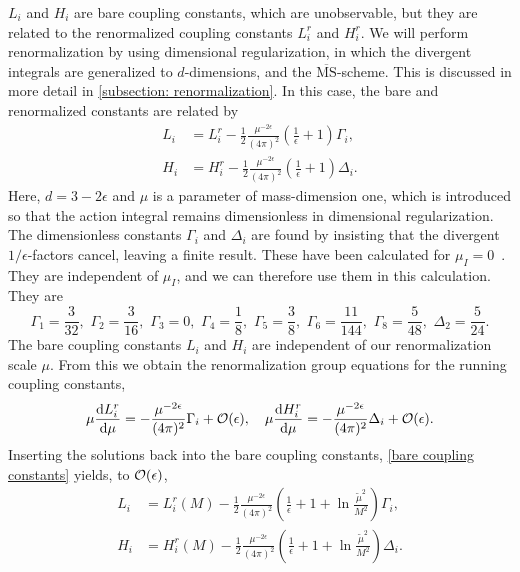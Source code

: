 $L_i$ and $H_i$  are bare coupling constants, which are unobservable, but they are related to the renormalized coupling constants $L_i^r$ and $H_i^r$.
We will perform renormalization by using dimensional regularization, in which the divergent integrals are generalized to $d$-dimensions, and the $\overline{\mathrm{MS}}$-scheme.
This is discussed in more detail in \autoref{subsection: renormalization}.
In this case, the bare and renormalized constants are related by
%
\begin{align}
    \label{bare coupling constants}
    L_i 
    & = L_i^r 
    - \frac{1}{2} \frac{\mu^{-2\epsilon}} {(4 \pi)^2}
    \left(\frac{1}{\epsilon} + 1 \right) \Gamma_i, \\
    H_i 
    & = H_i^r
    -  \frac{1}{2}  \frac{\mu^{-2\epsilon}}{(4 \pi)^2} 
    \left(\frac{1}{\epsilon} + 1 \right) \Delta_i .
\end{align}
%
Here, $d = 3 - 2\epsilon$ and $\mu$ is a parameter of mass-dimension one, which is introduced so that the action integral remains dimensionless in dimensional regularization.
The dimensionless constants $\Gamma_i$ and $\Delta_i$ are found by insisting that the divergent $1/\epsilon$-factors cancel, leaving a finite result.
These have been calculated for $\mu_I = 0$~\autocite{gasserChiralPerturbationTheory1985}.
They are independent of $\mu_I$, and we can therefore use them in this calculation.
They are
\begin{equation}
    \Gamma_1 = \frac{3}{32}, \,\,
    \Gamma_2 = \frac{3}{16}, \,\,
    \Gamma_3 = 0, \,\,
    \Gamma_4 = \frac{1}{8}, \,\,
    \Gamma_5 = \frac{3}{8}, \,\,
    \Gamma_6 = \frac{11}{144}, \,\,
    \Gamma_8 = \frac{5}{48}, \,\,
    \Delta_2 = \frac{5}{24}.
\end{equation}
%
The bare coupling constants $L_i$ and $H_i$ are independent of our renormalization scale $\mu$.
From this we obtain the renormalization group equations for the running coupling constants,
\begin{equation}
    \mu \diff{L_i^r}{\mu } 
    = - \frac{  \mu^{-2\epsilon} }{(4 \pi)^2} \Gamma_i + \mathcal{O}(\epsilon), \quad
    \mu \diff{H_i^r}{\mu } 
    = - \frac{ \mu^{-2\epsilon}}{(4 \pi)^2} \Delta_i + \mathcal{O}(\epsilon).
\end{equation}
%
Inserting the solutions back into the bare coupling constants, \autoref{bare coupling constants} yields, to $\mathcal O(\epsilon)$,
%
\begin{align}
    L_i
    &= 
    L_i^r(M)
    - \frac{1}{2} \frac{\mu^{-2\epsilon}} {(4 \pi)^2}
    \left(\frac{1}{\epsilon} + 1 + \ln{\frac{\tilde \mu^2}{M^2}}\right) \Gamma_i,
    \\
    H_i
    &= 
    H_i^r (M)
    - \frac{1}{2} \frac{\mu^{-2\epsilon}} {(4 \pi)^2}
    \left(\frac{1}{\epsilon} + 1 + \ln{\frac{\tilde \mu^2}{M^2}}\right) \Delta_i.
\end{align}
